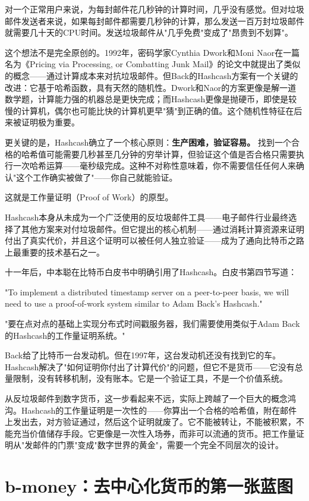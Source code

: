 \documentclass[a4paper,12pt,openany]{ctexbook}
\newenvironment{quoting}{%
  \par\vspace{0.5em}%
  \begin{list}{}{%
    \setlength{\leftmargin}{2em}%
    \setlength{\rightmargin}{2em}%
    \setlength{\parsep}{0.3em}%
    \setlength{\itemsep}{0pt}%
    \setlength{\topsep}{0pt}%
  }%
  \item\relax
}{%
  \end{list}%
  \par\vspace{0.5em}%
}
\begin{document}
对一个正常用户来说，为每封邮件花几秒钟的计算时间，几乎没有感觉。但对垃圾邮件发送者来说，如果每封邮件都需要几秒钟的计算，那么发送一百万封垃圾邮件就需要几十天的CPU时间。发送垃圾邮件从"几乎免费"变成了"昂贵到不划算"。

这个想法不是完全原创的。1992年，密码学家Cynthia Dwork和Moni Naor在一篇名为《Pricing via Processing, or Combatting Junk Mail》的论文中就提出了类似的概念——通过计算成本来对抗垃圾邮件。但Back的Hashcash方案有一个关键的改进：它基于哈希函数，具有天然的随机性。Dwork和Naor的方案更像是解一道数学题，计算能力强的机器总是更快完成；而Hashcash更像是抛硬币，即使是较慢的计算机，偶尔也可能比快的计算机更早"猜"到正确的值。这个随机性特征在后来被证明极为重要。

更关键的是，Hashcash确立了一个核心原则：\textbf{生产困难，验证容易。} 找到一个合格的哈希值可能需要几秒甚至几分钟的穷举计算，但验证这个值是否合格只需要执行一次哈希运算——毫秒级完成。这种不对称性意味着，你不需要信任任何人来确认"这个工作确实被做了"——你自己就能验证。

这就是工作量证明（Proof of Work）的原型。

Hashcash本身从未成为一个广泛使用的反垃圾邮件工具——电子邮件行业最终选择了其他方案来对付垃圾邮件。但它提出的核心机制——通过消耗计算资源来证明付出了真实代价，并且这个证明可以被任何人独立验证——成为了通向比特币之路上最重要的技术基石之一。

十一年后，中本聪在比特币白皮书中明确引用了Hashcash。白皮书第四节写道：


\begin{quoting}
\small
"To implement a distributed timestamp server on a peer-to-peer basis, we will need to use a proof-of-work system similar to Adam Back's Hashcash."

"要在点对点的基础上实现分布式时间戳服务器，我们需要使用类似于Adam Back的Hashcash的工作量证明系统。"
\end{quoting}


Back给了比特币一台发动机。但在1997年，这台发动机还没有找到它的车。Hashcash解决了"如何证明你付出了计算代价"的问题，但它不是货币——它没有总量限制，没有转移机制，没有账本。它是一个验证工具，不是一个价值系统。

从反垃圾邮件到数字货币，这一步看起来不远，实际上跨越了一个巨大的概念鸿沟。Hashcash的工作量证明是一次性的——你算出一个合格的哈希值，附在邮件上发出去，对方验证通过，然后这个证明就废了。它不能被转让，不能被积累，不能充当价值储存手段。它更像是一次性入场券，而非可以流通的货币。把工作量证明从"发邮件的门票"变成"数字世界的黄金"，需要一个完全不同层次的设计。


\section*{b-money：去中心化货币的第一张蓝图}
\end{document}

